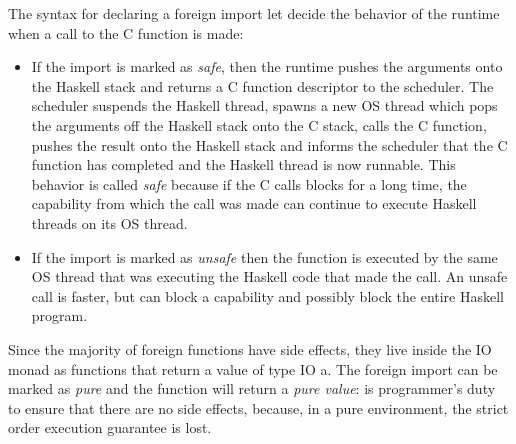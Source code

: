 The syntax for declaring a foreign import let decide the behavior of the runtime when a call to the C function is made:
\begin{itemize}
\item If the import is marked as \emph{safe}, then the runtime pushes the arguments onto the Haskell stack and returns a C function descriptor to the scheduler.
The scheduler suspends the Haskell thread, spawns a new OS thread which pops the arguments off the Haskell stack onto the C stack, calls the C function, pushes the result onto the Haskell stack and informs the scheduler that the C function has completed and the Haskell thread is now runnable.
This behavior is called \emph{safe} because if the C calls blocks for a long time, the capability from which the call was made can continue to execute Haskell threads on its OS thread.
\item If the import is marked as \emph{unsafe} then the function is executed by the same OS thread that was executing the Haskell code that made the call. An unsafe call is faster, but can block a capability and possibly block the entire Haskell program.
\end{itemize}

Since the majority of foreign functions have side effects, they live inside the IO monad as functions that return a value of type IO a. The foreign import can be marked as \emph{pure} and the function will return a \emph{pure value}: is programmer's duty to ensure that there are no side effects, because, in a pure environment, the strict order execution guarantee is lost.


